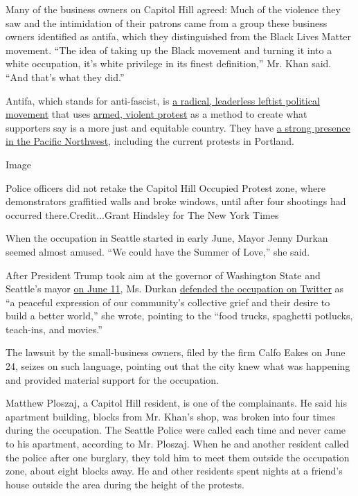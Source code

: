 Many of the business owners on Capitol Hill agreed: Much of the violence
they saw and the intimidation of their patrons came from a group these
business owners identified as antifa, which they distinguished from the
Black Lives Matter movement. ``The idea of taking up the Black movement
and turning it into a white occupation, it's white privilege in its
finest definition,'' Mr. Khan said. ``And that's what they did.''

Antifa, which stands for anti-fascist, is
\href{https://www.nytimes.com/article/what-antifa-trump.html}{a radical,
leaderless leftist political movement} that uses
\href{https://newrepublic.com/article/154110/antifa-arming-trump-crackdown}{armed,
violent protest} as a method to create what supporters say is a more
just and equitable country. They have
\href{https://www.theatlantic.com/magazine/archive/2017/09/the-rise-of-the-violent-left/534192/}{a
strong presence in the Pacific Northwest}, including the current
protests in Portland.

Image

Police officers did not retake the Capitol Hill Occupied Protest zone,
where demonstrators graffitied walls and broke windows, until after four
shootings had occurred there.Credit...Grant Hindsley for The New York
Times

When the occupation in Seattle started in early June, Mayor Jenny Durkan
seemed almost amused. ``We could have the Summer of Love,'' she said.

After President Trump took aim at the governor of Washington State and
Seattle's mayor
\href{https://twitter.com/realDonaldTrump/status/1271142274416562176}{on
June 11}, Ms. Durkan
\href{https://twitter.com/MayorJenny/status/1271226494858129409}{defended
the occupation on Twitter} as ``a peaceful expression of our community's
collective grief and their desire to build a better world,'' she wrote,
pointing to the ``food trucks, spaghetti potlucks, teach-ins, and
movies.''

The lawsuit by the small-business owners, filed by the firm Calfo Eakes
on June 24, seizes on such language, pointing out that the city knew
what was happening and provided material support for the occupation.

Matthew Ploszaj, a Capitol Hill resident, is one of the complainants. He
said his apartment building, blocks from Mr. Khan's shop, was broken
into four times during the occupation. The Seattle Police were called
each time and never came to his apartment, according to Mr. Ploszaj.
When he and another resident called the police after one burglary, they
told him to meet them outside the occupation zone, about eight blocks
away. He and other residents spent nights at a friend's house outside
the area during the height of the protests.


